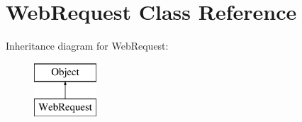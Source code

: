 \hypertarget{class_web_request}{\section{Web\-Request Class Reference}
\label{class_web_request}
}
Inheritance diagram for Web\-Request\-:\begin{figure}[H]
\begin{center}
\leavevmode
\includegraphics[height=2.000000cm]{class_web_request}
\end{center}
\end{figure}
